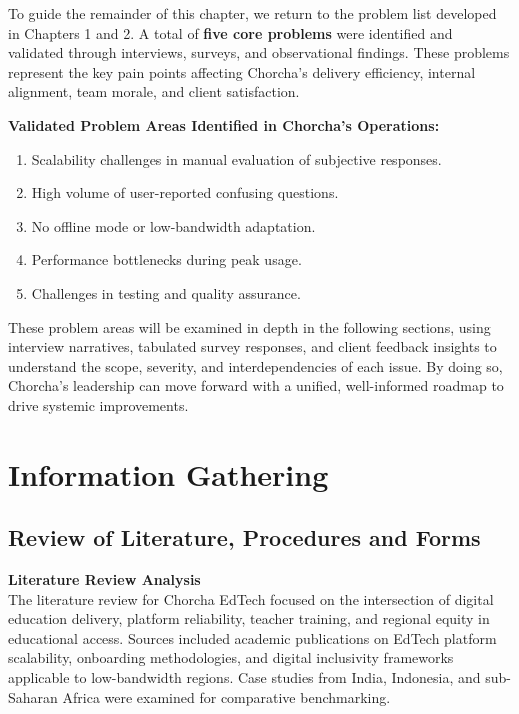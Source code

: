 \documentclass[12pt,a4paper,oneside]{book}
\begin{document}
To guide the remainder of this chapter, we return to the problem list developed in Chapters 1 and 2. A total of \textbf{five core problems} were identified and validated through interviews, surveys, and observational findings. These problems represent the key pain points affecting Chorcha’s delivery efficiency, internal alignment, team morale, and client satisfaction.

\textbf{Validated Problem Areas Identified in Chorcha’s Operations:}

\begin{enumerate}
  \item Scalability challenges in manual evaluation of subjective responses.
  \item High volume of user-reported confusing questions.
  \item No offline mode or low-bandwidth adaptation.
  \item Performance bottlenecks during peak usage.
  \item Challenges in testing and quality assurance.
\end{enumerate}

These problem areas will be examined in depth in the following sections, using interview narratives, tabulated survey responses, and client feedback insights to understand the scope, severity, and interdependencies of each issue. By doing so, Chorcha’s leadership can move forward with a unified, well-informed roadmap to drive systemic improvements.

\section{Information Gathering}

\subsection{Review of Literature, Procedures and Forms}

\textbf{Literature Review Analysis} \\
The literature review for Chorcha EdTech focused on the intersection of digital education delivery, platform reliability, teacher training, and regional equity in educational access. Sources included academic publications on EdTech platform scalability, onboarding methodologies, and digital inclusivity frameworks applicable to low-bandwidth regions. Case studies from India, Indonesia, and sub-Saharan Africa were examined for comparative benchmarking.\\
\end{document}
